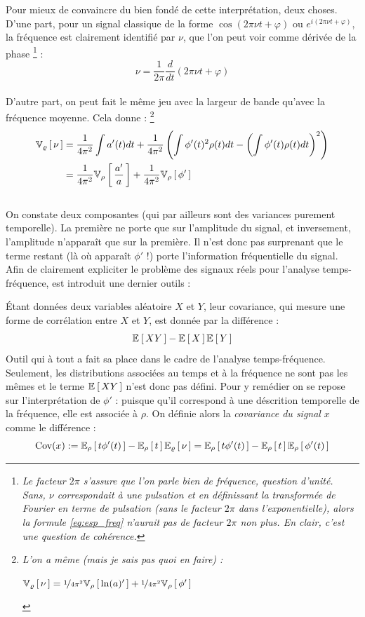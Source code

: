 Pour mieux de convaincre du bien fondé de cette interprétation, deux choses.
\\
D'une part, pour un signal classique de la forme $\cos(2\pi\nu t+\varphi)$ ou $e^{i(2\pi\nu t + \varphi)}$, la fréquence est clairement identifié par $\nu$, que l'on peut voir comme dérivée de la phase
	\footnote{\itshape 
			Le facteur $2\pi$ s'assure que l'on parle bien de fréquence, question d'unité. Sans, $\nu$ correspondait à une pulsation et en définissant la transformée de Fourier en terme de pulsation (\ie sans le facteur $2\pi$ dans l'exponentielle), alors la formule \eqref{eq:esp_freq} n'aurait pas de facteur $2\pi$ non plus. En clair, c'est une question de cohérence.} :
\[\nu = \frac{1}{2\pi}\frac{d}{dt}(2\pi\nu t+\varphi)\]
\\
D'autre part, on peut fait le même jeu avec la largeur de bande qu'avec la fréquence moyenne. Cela donne :
	\footnote{\itshape 
		L'on a même (mais je sais pas quoi en faire) : 
		\begin{center}
			$\var[\varrho]{\nu} =  \nicefrac{1}{4\pi^2}\var[\rho]{\ln(a)'} + \nicefrac{1}{4\pi^2} \var[\rho]{\phi'}$
		\end{center}}
\begin{align*}
	\var[\varrho]{\nu} &= \frac{1}{4\pi^2} \int a'(t) dt + \frac{1}{4\pi^2}\left(\int \phi'(t)^2 \rho(t) dt - \left(\int \phi'(t) \rho(t) dt \right)^2 \right) \\
	&= \frac{1}{4\pi^2}\var[\rho]{\frac{a'}{a}} +\frac{1}{4\pi^2} \var[\rho]{\phi'}
\end{align*}
\\
On constate deux composantes (qui par ailleurs sont des variances purement temporelle). La première ne porte que sur l'amplitude du signal, et inversement, l'amplitude n'apparaît que sur la première. Il n'est donc pas surprenant que le terme restant (là où apparaît $\phi'$ !) porte l'information fréquentielle du signal.
\\

Afin de clairement expliciter le problème des signaux réels pour l'analyse temps-fréquence, est introduit une dernier outils :
\\

\begin{definition}[Covariance]\label{def:cova_signal}
	Étant données deux variables aléatoire $X$ et $Y$, leur covariance, qui mesure une forme de corrélation entre $X$ et $Y$, est donnée par la différence :
	\[\esp{XY}-\esp{X}\esp{Y}\]
	Outil qui à tout a fait sa place dans le cadre de l'analyse temps-fréquence. Seulement, les distributions associées au temps et à la fréquence ne sont pas les mêmes et le terme $\esp{XY}$ n'est donc pas défini.
	Pour y remédier on se repose sur l'interprétation de $\phi'$ : puisque qu'il correspond à une déscrition temporelle de la fréquence, elle est associée à $\rho$. On définie alors la \emph{covariance du signal} $x$ comme le différence :
	\begin{equation}\label{eq:cov_signal}
		\text{Cov}(x) \defeq \esp[\rho]{t\phi'(t)} - \esp[\rho]{t} \esp[\varrho]{\nu} = \esp[\rho]{t\phi'(t)} - \esp[\rho]{t} \esp[\rho]{\phi'(t)}
	\end{equation}
\end{definition}


